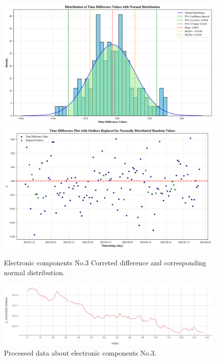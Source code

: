 \begin{figure}[H]
	\centering
	\includegraphics[width=\linewidth]{figures/No.3_Corrected_and_Normal_Distribution} 
	\includegraphics[width=\linewidth]{figures/No.3_Corrected_Diff} 
	\caption{Electronic components No.3 Correted difference and corresponding normal distribution.}
	\label{fig:No.3_Corrected_and_Normal_Distribution}
\end{figure}

\begin{figure}[H]
	\centering
	\includegraphics[width=\linewidth]{figures/No.3data_precessed} 
	\caption{Processed data about electronic components No.3.}
	\label{fig:No.3data_precessed}
\end{figure}
